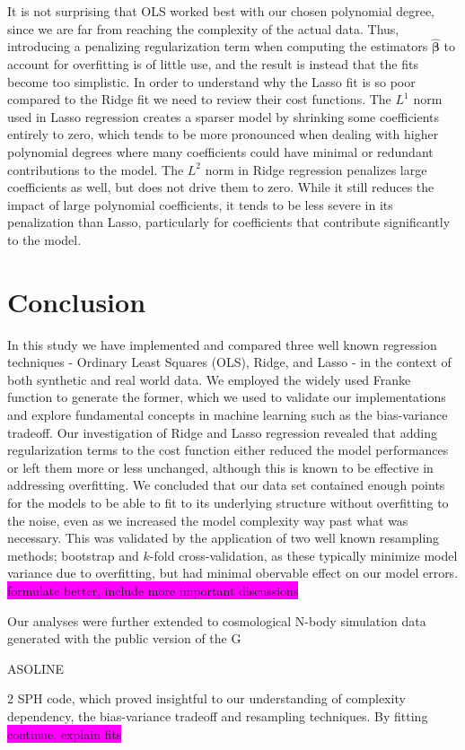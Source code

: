 \documentclass[aps,pra,english,notitlepage,reprint,nofootinbib]{revtex4-1}  %
\begin{document}
It is not surprising that OLS worked best with our chosen polynomial degree, since we are far from reaching the complexity of the actual data. Thus, introducing a penalizing regularization term when computing the estimators $\boldsymbol{\hat{\beta}}$ to account for overfitting is of little use, and the result is instead that the fits become too simplistic. In order to understand why the Lasso fit is so poor compared to the Ridge fit we need to review their cost functions. The $L^1$ norm used in Lasso regression creates a sparser model by shrinking some coefficients entirely to zero, which tends to be more pronounced when dealing with higher polynomial degrees where many coefficients could have minimal or redundant contributions to the model. The $L^2$ norm in Ridge regression penalizes large coefficients as well, but does not drive them to zero. While it still reduces the impact of large polynomial coefficients, it tends to be less severe in its penalization than Lasso, particularly for coefficients that contribute significantly to the model.



\section{Conclusion}\label{sec:conclusion}
In this study we have implemented and compared three well known regression techniques - Ordinary Least Squares (OLS), Ridge, and Lasso - in the context of both synthetic and real world data. We employed the widely used Franke function to generate the former, which we used to validate our implementations and explore fundamental concepts in machine learning such as the bias-variance tradeoff. Our investigation of Ridge and Lasso regression revealed that adding regularization terms to the cost function either reduced the model performances or left them more or less unchanged, although this is known to be effective in addressing overfitting. We concluded that our data set contained enough points for the models to be able to fit to its underlying structure without overfitting to the noise, even as we increased the model complexity way past what was necessary. This was validated by the application of two well known resampling methods; bootstrap and $k$-fold cross-validation, as these typically minimize model variance due to overfitting, but had minimal obervable effect on our model errors. \colorbox{magenta}{formulate better, include more important discussions}

Our analyses were further extended to cosmological N-body simulation data generated with the public version of the G\begin{scriptsize}ASOLINE\end{scriptsize}2 SPH code, which proved insightful to our understanding of complexity dependency, the bias-variance tradeoff and resampling techniques. By fitting \colorbox{magenta}{continue, explain fits}
\end{document}
